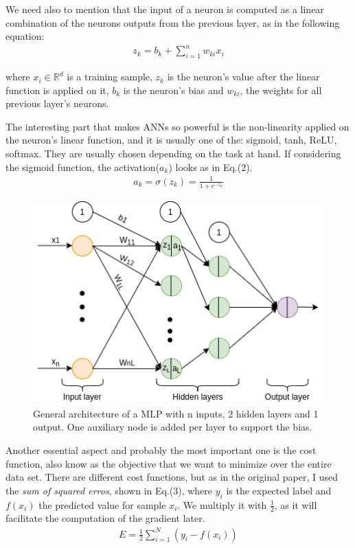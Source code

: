 \documentclass{article}
\begin{document}
	We need also to mention that the input of a neuron is computed as a linear combination of the neurons outputs from the previous layer, as in the 
	following equation:
	\begin{eqnarray}
		z_k = b_k + \sum_{i=1}^{n}w_{ki}x_i 
	\end{eqnarray}
	
	where $x_i \in \mathbb{R}^d$ is a training sample, $z_k$ is the neuron's value after the linear function is applied on it, $b_k$ is the neuron's bias and $w_{ki}$, the weights for all previous layer's neurons.
	
	The interesting part that makes ANNs so powerful is the non-linearity  applied on the neuron's linear function, and it is usually one of the: sigmoid, tanh, ReLU, softmax. They are usually chosen depending on the task at hand. If considering the sigmoid function, the activation($a_k$) looks as in Eq.(2).
	\begin{eqnarray}
		a_k = \sigma(z_k) = \frac{1}{1+e^{-z_k}} 
	\end{eqnarray}
	
	
	\begin{figure}[htbp]
		\centering
		\includegraphics[scale=0.6]{fig/MLP.png}
		\caption{General architecture of a MLP with n inputs, 2 hidden layers and 1 output. One auxiliary node is added per layer to support the bias.}
		\label{fig:mlp_1}
	\end{figure}
	
	Another essential aspect and probably the most important one is the cost function, also know as the objective that we want to minimize over the entire data set. There are different cost functions, but as in the original paper\cite{rumelhart}, I used the \textit{sum of squared erros}, shown in Eq.(3), where $y_i$ is the expected label and $f(x_i)$ the predicted value for sample $x_i$. We multiply it with $\frac{1}{2}$, as it will facilitate the computation of the gradient later.
	\begin{eqnarray}
		E = \frac{1}{2} \sum_{i=1}^{N}(y_i - f(x_i))
	\end{eqnarray}
	
\end{document}
